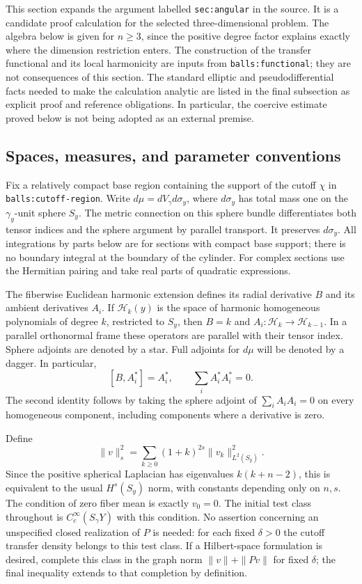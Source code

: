 \documentclass[11pt]{article}
\theoremstyle{definition}
\theoremstyle{remark}
\numberwithin{equation}{section}
\begin{document}
This section expands the argument labelled \texttt{sec:angular} in the
source.  It is a candidate proof calculation for the selected three-dimensional
problem.  The algebra below is given for $n\geq3$, since the positive degree
factor explains exactly where the dimension restriction enters.  The
construction of the transfer functional and its local harmonicity are inputs
from \texttt{balls:functional}; they are not consequences of this section.
The standard elliptic and pseudodifferential facts needed to make the
calculation analytic are listed in the final subsection as explicit proof
and reference obligations.  In particular, the coercive estimate proved
below is not being adopted as an external premise.

\subsection{Spaces, measures, and parameter conventions}

Fix a relatively compact base region containing the support of the cutoff
$\chi$ in \texttt{balls:cutoff-region}.  Write $d\mu=dV_\gamma d\sigma_y$,
where $d\sigma_y$ has total mass one on the $\gamma_y$-unit sphere $S_y$.
The metric connection on this sphere bundle differentiates both tensor
indices and the sphere argument by parallel transport.  It preserves
$d\sigma_y$.  All integrations by parts below are for sections with compact
base support; there is no boundary integral at the boundary of the cylinder.
For complex sections use the Hermitian pairing and take real parts of
quadratic expressions.

The fiberwise Euclidean harmonic extension defines its radial derivative
$B$ and its ambient derivatives $A_i$.  If $\mathcal H_k(y)$ is the space
of harmonic homogeneous polynomials of degree $k$, restricted to $S_y$,
then $B=k$ and $A_i:\mathcal H_k\to\mathcal H_{k-1}$.  In a parallel
orthonormal frame these operators are parallel with their tensor index.
Sphere adjoints are denoted by a star.  Full adjoints for $d\mu$ will be
denoted by a dagger.  In particular,
\begin{equation}\label{angular-expanded:elementary-identities}
 [B,A_i^*]=A_i^*,\qquad \sum_i A_i^*A_i^*=0.
\end{equation}
The second identity follows by taking the sphere adjoint of
$\sum_iA_iA_i=0$ on every homogeneous component, including components
where a derivative is zero.

Define
\[
 \|v\|_s^2=\sum_{k\geq0}(1+k)^{2s}\|v_k\|_{L^2(S_y)}^2.
\]
Since the positive spherical Laplacian has eigenvalues $k(k+n-2)$,
this is equivalent to the usual $H^s(S_y)$ norm, with constants depending
only on $n,s$.  The condition of zero fiber mean is exactly $v_0=0$.
The initial test class throughout is $C_c^\infty(S_\gamma Y)$ with this
condition.  No assertion concerning an unspecified closed realization of
$P$ is needed: for each fixed $\delta>0$ the cutoff transfer density belongs
to this test class.  If a Hilbert-space formulation is desired, complete
this class in the graph norm $\|v\|+\|Pv\|$ for fixed $\delta$; the final
inequality extends to that completion by definition.
\end{document}
